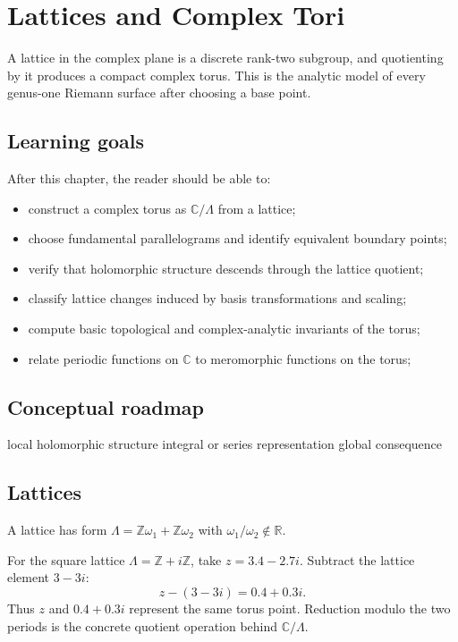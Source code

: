 \chapter{Lattices and Complex Tori}
\label{ch:iv27}

A lattice in the complex plane is a discrete rank-two subgroup, and quotienting by it produces a compact complex torus. This is the analytic model of every genus-one Riemann surface after choosing a base point.

\section*{Learning goals}
After this chapter, the reader should be able to:
\begin{itemize}
\item construct a complex torus as \(\mathbb C/\Lambda\) from a lattice;
\item choose fundamental parallelograms and identify equivalent boundary points;
\item verify that holomorphic structure descends through the lattice quotient;
\item classify lattice changes induced by basis transformations and scaling;
\item compute basic topological and complex-analytic invariants of the torus;
\item relate periodic functions on \(\mathbb C\) to meromorphic functions on the torus;
\end{itemize}
\section*{Conceptual roadmap}
\volroadmap
  {local holomorphic structure}
  {integral or series representation}
  {global consequence}

\section{Lattices}
A lattice has form $\Lambda=\mathbb Z\omega_1+\mathbb Z\omega_2$ with $\omega_1/\omega_2\notin\mathbb R$.

\begin{example}\label{ex:iv27-expand-01}
For the square lattice \(\Lambda=\mathbb Z+i\mathbb Z\), take \(z=3.4-2.7i\). Subtract the lattice element \(3-3i\):
\[
z-(3-3i)=0.4+0.3i.
\]
Thus \(z\) and \(0.4+0.3i\) represent the same torus point. Reduction modulo the two periods is the concrete quotient operation behind \(\mathbb C/\Lambda\).
\end{example}
